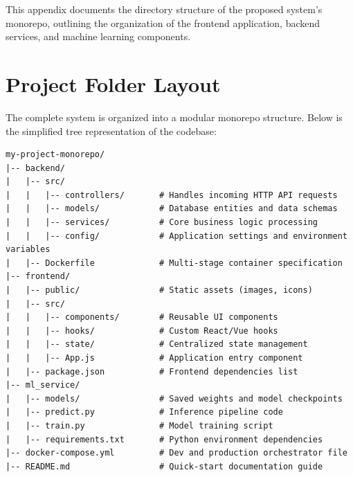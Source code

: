 This appendix documents the directory structure of the proposed system's monorepo, outlining the organization of the frontend application, backend services, and machine learning components.

\section*{Project Folder Layout}
The complete system is organized into a modular monorepo structure. Below is the simplified tree representation of the codebase:

\begin{tcolorbox}[colback=black!5, colframe=black!80, title={System Directory Structure}]
\begin{verbatim}
my-project-monorepo/
|-- backend/
|   |-- src/
|   |   |-- controllers/       # Handles incoming HTTP API requests
|   |   |-- models/            # Database entities and data schemas
|   |   |-- services/          # Core business logic processing
|   |   |-- config/            # Application settings and environment variables
|   |-- Dockerfile             # Multi-stage container specification
|-- frontend/
|   |-- public/                # Static assets (images, icons)
|   |-- src/
|   |   |-- components/        # Reusable UI components
|   |   |-- hooks/             # Custom React/Vue hooks
|   |   |-- state/             # Centralized state management
|   |   |-- App.js             # Application entry component
|   |-- package.json           # Frontend dependencies list
|-- ml_service/
|   |-- models/                # Saved weights and model checkpoints
|   |-- predict.py             # Inference pipeline code
|   |-- train.py               # Model training script
|   |-- requirements.txt       # Python environment dependencies
|-- docker-compose.yml         # Dev and production orchestrator file
|-- README.md                  # Quick-start documentation guide
\end{verbatim}
\end{tcolorbox}
